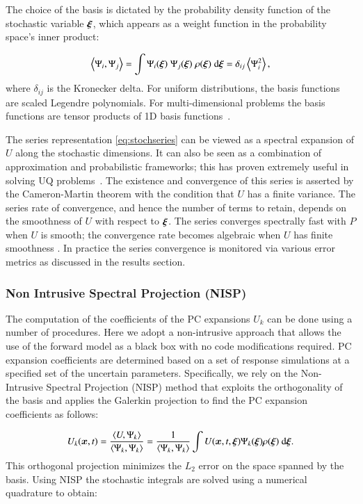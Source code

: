 The choice of the basis is dictated by the probability density
function of the stochastic variable $\xxi$, which appears as a weight
function in the probability space's inner product:

\begin{equation}
 \left<\Psi_i,\Psi_j\right> = \int \Psi_i(\xxi) \;\Psi_j(\xxi) \; \rho(\xxi) \; \mbox{d}\xxi=\delta_{ij}\ave{\Psi_i^2},
\label{eq:inner}
\end{equation}
where $\delta_{ij}$ is the Kronecker delta.
For uniform
distributions, the basis functions are scaled Legendre polynomials.
For multi-dimensional problems the basis functions are
tensor products of 1D basis functions~\cite{LeMaitreKnio2010}.

The series representation \eqref{eq:stochseries} can be viewed as a spectral expansion
of $U$ along the stochastic dimensions. It can also be seen as a
combination of approximation and probabilistic frameworks; this
 has proven extremely useful in solving UQ problems~\cite{Xiu:2003,Lin2009}. The existence and convergence of this series is asserted by the Cameron-Martin theorem \citep{Cameron:1947} with the condition that $U$ has a finite variance.
The series rate of convergence, and hence the number of terms to retain, depends on the smoothness of
$U$ with respect to $\xxi$. The series converges spectrally fast with $P$
when $U$ is smooth; the convergence rate becomes algebraic
when $U$ has finite smoothness \citep{Canuto:2006}. In practice the series convergence is monitored 
via various error metrics as discussed in the results section.

\subsubsection{Non Intrusive Spectral Projection (NISP)}
The computation of the coefficients of the PC expansions $U_k$
can be done using a number of procedures. Here we adopt a non-intrusive
approach that allows the use of the forward model \geoclaw as a black box
with no code modifications required. PC expansion coefficients are determined
based on a set of response \geoclaw simulations at a specified set of the uncertain parameters. 
Specifically, we rely on the Non-Intrusive Spectral Projection (NISP) method that exploits the orthogonality of the basis and applies the Galerkin projection to find the PC expansion coefficients as follows:

\begin{equation}
 U_k(\bm{x},t) = \frac{\left< U, \Psi_k \right>}{\left< \Psi_k, \Psi_k \right>} = 
 \frac{1}{\left< \Psi_k, \Psi_k \right>} 
 \int U(\bm{x},t,\xxi) \Psi_k(\xxi) \rho(\xxi) \mbox{ d}\xxi.
\end{equation}
This orthogonal projection minimizes the $L_2$ error on the space spanned by the basis.
Using NISP the stochastic integrals are solved using a numerical quadrature to obtain:

